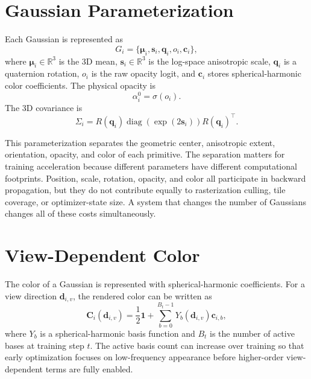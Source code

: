 \section{Gaussian Parameterization}

Each Gaussian is represented as
\begin{equation}
G_i =
\{\boldsymbol{\mu}_i,\mathbf{s}_i,\mathbf{q}_i,o_i,\mathbf{c}_i\},
\end{equation}
where $\boldsymbol{\mu}_i \in \mathbb{R}^3$ is the 3D mean, $\mathbf{s}_i \in \mathbb{R}^3$ is the log-space anisotropic scale, $\mathbf{q}_i$ is a quaternion rotation, $o_i$ is the raw opacity logit, and $\mathbf{c}_i$ stores spherical-harmonic color coefficients. The physical opacity is
\begin{equation}
\alpha_i^0 = \sigma(o_i).
\end{equation}
The 3D covariance is
\begin{equation}
\Sigma_i =
R(\mathbf{q}_i)
\operatorname{diag}(\exp(2\mathbf{s}_i))
R(\mathbf{q}_i)^\top .
\end{equation}

This parameterization separates the geometric center, anisotropic extent, orientation, opacity, and color of each primitive. The separation matters for training acceleration because different parameters have different computational footprints. Position, scale, rotation, opacity, and color all participate in backward propagation, but they do not contribute equally to rasterization culling, tile coverage, or optimizer-state size. A system that changes the number of Gaussians changes all of these costs simultaneously.

\section{View-Dependent Color}

The color of a Gaussian is represented with spherical-harmonic coefficients. For a view direction $\mathbf{d}_{i,v}$, the rendered color can be written as
\begin{equation}
\mathbf{C}_i(\mathbf{d}_{i,v})
=
\frac{1}{2}\mathbf{1}
+
\sum_{b=0}^{B_t-1}
Y_b(\mathbf{d}_{i,v})\mathbf{c}_{i,b},
\end{equation}
where $Y_b$ is a spherical-harmonic basis function and $B_t$ is the number of active bases at training step $t$. The active basis count can increase over training so that early optimization focuses on low-frequency appearance before higher-order view-dependent terms are fully enabled.

